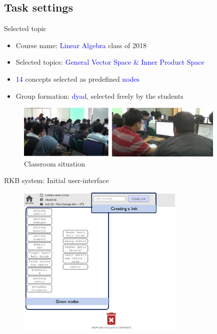 \subsection{Task settings}

\begin{frame}{Selected topic}
\begin{itemize}
    \item Course name: \textcolor{blue}{Linear Algebra} class of 2018
    \item Selected topics: \textcolor{blue}{General Vector Space \& Inner Product Space}
    \item \textcolor{blue}{14} concepts selected as predefined \textcolor{blue}{nodes}
    \item Group formation: \textcolor{blue}{dyad}, selected freely by the students
\end{itemize}

\begin{figure}[tb]
    \begin{center}
            \includegraphics[width=100mm]{images/classroom_situation.png}
        \end{center}
        \caption{Classroom situation}
        \label{intro::classroom}
    \end{figure}
\end{frame}

\begin{frame}{RKB system: Initial user-interface}
    \begin{figure}[tb]
        \begin{center}
            \includegraphics[width=80mm]{images/system_interface.png}
        \end{center}
    \end{figure}
\end{frame}

